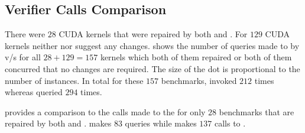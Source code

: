 

\subsection{Verifier Calls Comparison}
There were $28$ CUDA kernels that were repaired by both \tool and \autosync. For $129$ CUDA kernels neither \tool nor \autosync suggest any changes.  shows the number of queries made to \verifier by \autosync v/s \tool for all $28+129=157$ kernels which both of them repaired or both of them concurred that no changes are required. The size of the dot is proportional to the number of instances. In total for these $157$ benchmarks, \autosync invoked \verifier $212$ times whereas \tool queried \verifier $294$ times.

 provides a comparison to the calls made to the \verifier for only $28$ benchmarks that are repaired by both \tool and \autosync. \tool makes $83$ queries while \autosync makes $137$ calls to \verifier.


